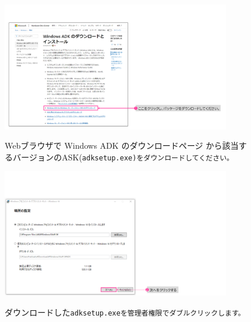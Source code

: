 \begin{figure}[h]
    \begin{minipage}{0.6\textwidth}
        \vspace{0cm}
        \includegraphics[width=10cm]{figures/Install_WinADK-01.png}
    \end{minipage}
    \begin{minipage}{0.4\textwidth}
        Webブラウザで Windows ADK のダウンロードページ\protect\footnotemark
        から該当するバージョンのASK(\tt{adksetup.exe})をダウンロードしてください。
    \end{minipage}
\end{figure}

\begin{figure}[hp]
    \begin{minipage}{0.6\textwidth}
        \vspace{0cm}
        \includegraphics[width=10cm]{figures/Install_WinADK-02.png}
    \end{minipage}
    \begin{minipage}{0.4\textwidth}
        ダウンロードした\tt{adksetup.exe}を管理者権限でダブルクリックします。
    \end{minipage}
\end{figure}

